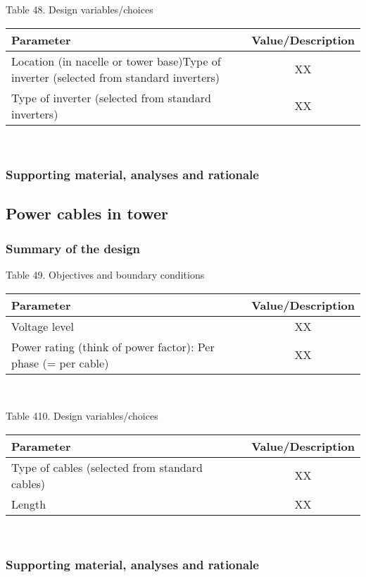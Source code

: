 \begin{center}
Table 48. Design variables/choices\\
\begin{tabular}{ |l|c| } 
\hline
\textbf{Parameter} & \textbf{Value/Description}  \\ 
\hline
Location (in nacelle or tower base)Type of inverter (selected from standard inverters) & XX  \\ 
\hline
Type of inverter (selected from standard inverters) & XX \\
\hline
\end{tabular} \\
\end{center}

\subsubsection{Supporting material, analyses and rationale}



\subsection{Power cables in tower}

\subsubsection{Summary of the design}

\begin{center}
Table 49. Objectives and boundary conditions\\
\begin{tabular}{ |l|c| } 
\hline
\textbf{Parameter} & \textbf{Value/Description}  \\ 
\hline
Voltage level & XX  \\ 
\hline
Power rating (think of power factor): Per phase (= per cable) & XX \\
\hline
\end{tabular} \\
\end{center}

\begin{center}
Table 410. Design variables/choices\\
\begin{tabular}{ |l|c| } 
\hline
\textbf{Parameter} & \textbf{Value/Description}  \\ 
\hline
Type of cables (selected from standard cables) & XX  \\ 
\hline
Length & XX \\
\hline
\end{tabular} \\
\end{center}
\subsubsection{Supporting material, analyses and rationale}


